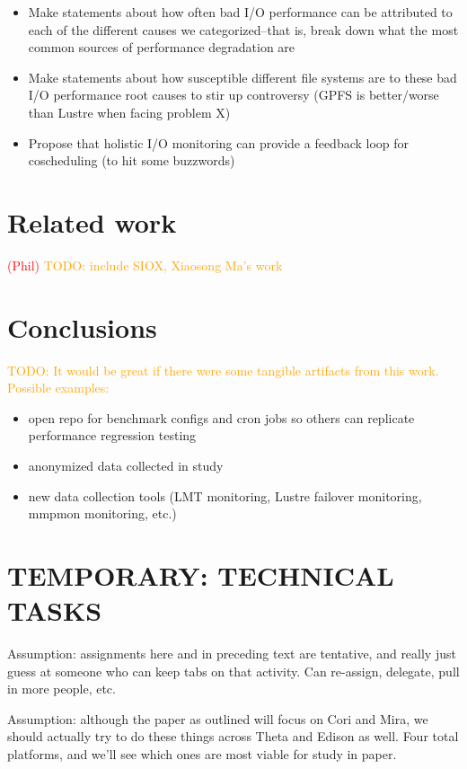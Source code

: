 \documentclass[conference,10pt,compsocconf]{IEEEtran}
\newcommand{\assign}[1]{\textcolor{red}{(#1)}}
\newcommand{\todo}[1]{\textcolor{Orange}{TODO: #1}}
\begin{document}
\begin{itemize}
\item Make statements about how often bad I/O performance can be attributed to each
of the different causes we categorized--that is, break down what the most
common sources of performance degradation are
\item Make statements about how susceptible different file systems are to these bad
I/O performance root causes to stir up controversy (GPFS is better/worse than
Lustre when facing problem X)
\item Propose that holistic I/O monitoring can provide a feedback loop for
coscheduling (to hit some buzzwords)
\end{itemize}

\section{Related work}

\assign{Phil} \todo{include SIOX, Xiaosong Ma's work}

\section{Conclusions}

\todo{It would be great if there were some tangible artifacts from this work.
Possible examples:}
\begin{itemize}
\item open repo for benchmark configs and cron jobs so others can replicate
performance regression testing
\item anonymized data collected in study
\item new data collection tools (LMT monitoring, Lustre failover monitoring,
mmpmon monitoring, etc.)
\end{itemize}

\section{TEMPORARY: TECHNICAL TASKS}

Assumption: assignments here and in preceding text are tentative, and really
just guess at someone who can keep tabs on that activity.  Can re-assign,
delegate, pull in more people, etc.

Assumption: although the paper as outlined will focus on Cori and Mira, we
should actually try to do these things across Theta and Edison as well.  Four
total platforms, and we'll see which ones are most viable for study in paper.
\end{document}
